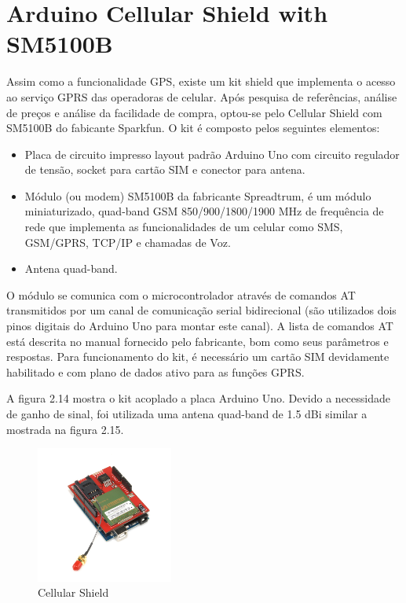 \section {Arduino Cellular Shield with SM5100B}

Assim como a funcionalidade GPS, existe um kit shield que implementa o acesso ao serviço GPRS das operadoras de celular. Após pesquisa de referências, análise de preços e análise da facilidade de compra, optou-se pelo Cellular Shield com SM5100B do fabicante Sparkfun. O kit é composto pelos seguintes elementos:

\begin{itemize}
	\item Placa de circuito impresso layout padrão Arduino Uno com circuito regulador de tensão, socket para cartão SIM e conector para antena.
	\item Módulo (ou modem) SM5100B da fabricante Spreadtrum, é um módulo miniaturizado, quad-band GSM 850/900/1800/1900 MHz de frequência de rede que implementa as funcionalidades de um celular como SMS, GSM/GPRS, TCP/IP e chamadas de Voz.
	\item Antena quad-band.
\end{itemize}

O módulo se comunica com o microcontrolador através de comandos AT transmitidos por um canal de comunicação serial bidirecional (são utilizados dois pinos digitais do Arduino Uno para montar este canal). A lista de comandos AT está descrita no manual fornecido pelo fabricante, bom como seus parâmetros e respostas. Para funcionamento do kit, é necessário um cartão SIM devidamente habilitado e com plano de dados ativo para as funções GPRS.

 A figura 2.14 mostra o kit acoplado a placa Arduino Uno. Devido a necessidade de ganho de sinal, foi utilizada uma antena quad-band de 1.5 dBi similar a mostrada na figura 2.15.

\begin{figure}[h!]
			\centering
			\includegraphics[width=0.4\textwidth]{figures/gsm.jpg}
			\caption{Cellular Shield}
			\label{1}
\end{figure}


